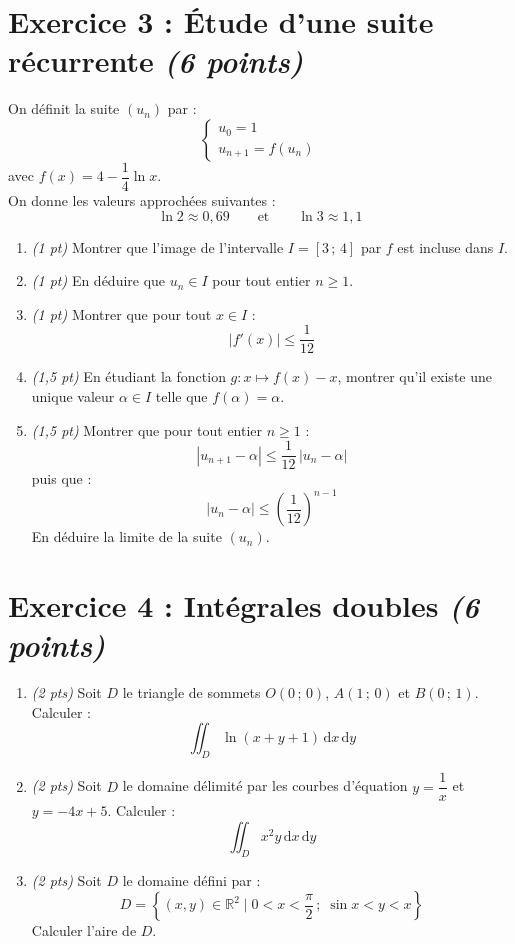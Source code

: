 \vspace{0.5em}

\section*{Exercice 3 : Étude d'une suite récurrente \hfill \normalfont\itshape (6 points)}
On définit la suite $(u_n)$ par :
$$\begin{cases}
    u_0=1\\
    u_{n+1}=f(u_n)
\end{cases}$$
avec $f(x)=4-\dfrac{1}{4} \ln x$.\\[0.3em]
On donne les valeurs approchées suivantes :
$$\ln 2 \approx 0{,}69 \qquad \text{et} \qquad \ln 3 \approx 1{,}1$$
\begin{enumerate}[itemsep=0.4em]
    \item \textit{(1 pt)} Montrer que l'image de l'intervalle $I=[3\,;\,4]$ par $f$ est incluse dans $I$.
    \item \textit{(1 pt)} En déduire que $u_n \in I$ pour tout entier $n \geq 1$.
    \item \textit{(1 pt)} Montrer que pour tout $x\in I$ :
    $$|f'(x)|\leq \frac{1}{12}$$
    \item \textit{(1{,}5 pt)} En étudiant la fonction $g:x\mapsto f(x)-x$, montrer qu'il existe une unique valeur $\alpha \in I$ telle que $f(\alpha)=\alpha$.
    \item \textit{(1{,}5 pt)} Montrer que pour tout entier $n \geq 1$ :
    $$|u_{n+1}-\alpha| \leq \frac{1}{12}\, |u_n-\alpha|$$
    puis que :
    $$|u_n- \alpha |\leq \left( \frac{1}{12} \right)^{n-1}$$
    En déduire la limite de la suite $(u_n)$.
\end{enumerate}

\vspace{1em}

\section*{Exercice 4 : Intégrales doubles \hfill \normalfont\itshape (6 points)}
\begin{enumerate}[itemsep=0.6em]
    \item \textit{(2 pts)} Soit $D$ le triangle de sommets $O(0\,;\,0)$, $A(1\,;\,0)$ et $B(0\,;\,1)$. Calculer :
    $$\iint_D \ln(x+y+1)\, \mathrm{d}x\, \mathrm{d}y$$
    \item \textit{(2 pts)} Soit $D$ le domaine délimité par les courbes d'équation $y=\dfrac{1}{x}$ et $y=-4x+5$. Calculer :
    $$\iint_D x^2 y\, \mathrm{d}x\, \mathrm{d}y$$
    \item \textit{(2 pts)} Soit $D$ le domaine défini par :
    $$D=\left\{(x,y)\in \mathbb{R}^2 \;\Big|\; 0<x<\dfrac{\pi}{2}\,;\; \sin x<y<x \right\}$$
    Calculer l'aire de $D$.
\end{enumerate}


